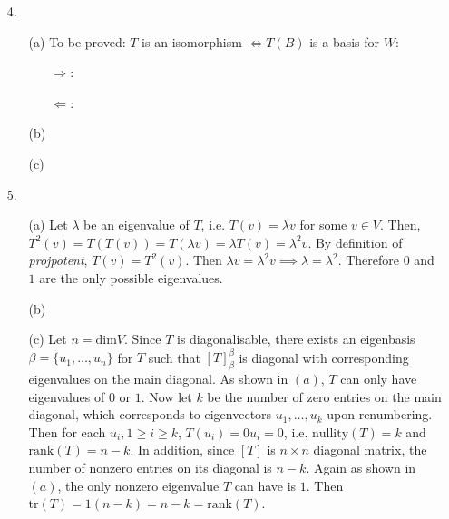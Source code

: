\documentclass{article}
\begin{document}
\newpage

\begin{itemize}
	\item [4.]
	      \begin{itemize}
			  \item [(a)] To be proved: $T$ is an isomorphism $\Leftrightarrow T(B)$ is a basis for $W$:
			  \begin{itemize}
				  \item [$\Rightarrow$:] 
				  \item [$\Leftarrow$:] 
			  \end{itemize}
		      \item [(b)]
		      \item [(c)]
	      \end{itemize}
\end{itemize}

\newpage

\begin{itemize}
	\item [5.]
	      \begin{itemize}
		      \item [(a)] Let $\lambda$ be an eigenvalue of $T$, i.e. $T(v)=\lambda v$ for some $v\in V$. Then, $T^2(v)=T(T(v))=T(\lambda v)=\lambda T(v)=\lambda^2v$. By definition of \textit{projpotent}, $T(v)=T^2(v)$. Then $\lambda v=\lambda^2 v \implies \lambda=\lambda^2$. Therefore $0$ and $1$ are the only possible eigenvalues.
		      \item [(b)]
			  \item [(c)] Let $n=\text{dim}V$. Since $T$ is diagonalisable, there exists an eigenbasis $\beta=\{u_1,\ldots,u_n\}$ for $T$ such that $[T]_\beta^\beta$ is diagonal with corresponding eigenvalues on the main diagonal. As shown in $(a)$, $T$ can only have eigenvalues of $0$ or $1$. Now let $k$ be the number of zero entries on the main diagonal, which corresponds to eigenvectors $u_1,\ldots,u_k$ upon renumbering. Then for each $u_i, 1\geq i\geq k$, $T(u_i)=0u_i=0$, i.e. $\text{nullity}(T)=k$ and $\text{rank}(T)=n-k$. In addition, since $[T]$ is $n\times n$ diagonal matrix, the number of nonzero entries on its diagonal is $n-k$. Again as shown in $(a)$, the only nonzero eigenvalue $T$ can have is $1$. Then $\text{tr}(T)=1(n-k)=n-k=\text{rank}(T)$.
	      \end{itemize}
\end{itemize}
\end{document}
